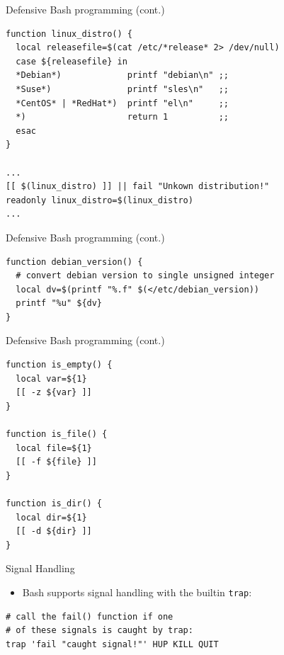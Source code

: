 \begin{frame}[fragile]{Defensive Bash programming (cont.)}

\begin{verbatim}
function linux_distro() {
  local releasefile=$(cat /etc/*release* 2> /dev/null)
  case ${releasefile} in
  *Debian*)             printf "debian\n" ;;
  *Suse*)               printf "sles\n"   ;;
  *CentOS* | *RedHat*)  printf "el\n"     ;;
  *)                    return 1          ;;
  esac
}

...
[[ $(linux_distro) ]] || fail "Unkown distribution!"
readonly linux_distro=$(linux_distro)
...
\end{verbatim}

\end{frame}

\begin{frame}[fragile]{Defensive Bash programming (cont.)}

\begin{verbatim}
function debian_version() {
  # convert debian version to single unsigned integer
  local dv=$(printf "%.f" $(</etc/debian_version))
  printf "%u" ${dv}
}
\end{verbatim}

\end{frame}

\begin{frame}[fragile]{Defensive Bash programming (cont.)}

\begin{verbatim}
function is_empty() {
  local var=${1}
  [[ -z ${var} ]]
}

function is_file() {
  local file=${1}
  [[ -f ${file} ]]
}

function is_dir() {
  local dir=${1}
  [[ -d ${dir} ]]
}
\end{verbatim}

\end{frame}

\begin{frame}[fragile]{Signal Handling}

\begin{itemize}
\itemsep1pt\parskip0pt
\item
  Bash supports signal handling with the builtin \texttt{trap}:
\end{itemize}

\begin{verbatim}
# call the fail() function if one
# of these signals is caught by trap:
trap 'fail "caught signal!"' HUP KILL QUIT
\end{verbatim}

\end{frame}


